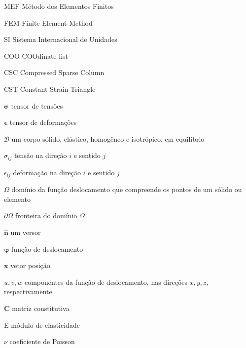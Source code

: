 
\listoffigures*
\cleardoublepage



\listoftables*
\cleardoublepage

\begin{siglas}
	\item[MEF] Método dos Elementos Finitos
	\item[FEM] Finite Element Method 
	\item[SI]  Sistema Internacional de Unidades
	\item[COO] COOdinate list
	\item[CSC] Compressed Sparse Column
	\item[CST] Constant Strain Triangle    
\end{siglas}



\begin{simbolos}

  \item[$\bm{\sigma}$] tensor de tensões
  \item[$\bm{\epsilon}$] tensor de deformações
  \item[$\mathcal{B}$] um corpo sólido, elástico, homogêneo e isotrópico, em equilíbrio
  \item[$\sigma_{ij}$] tensão na direção $i$ e sentido $j$
  \item[$\epsilon_{ij}$] deformação na direção $i$ e sentido $j$
  \item[$\Omega$] domínio da função deslocamento que compreende os pontos de um sólido ou elemento
  \item[$\partial\Omega$] fronteira do domínio $\Omega$
  \item[$\bm{\hat{n}}$] um versor
  \item[$\bm{\varphi}$] função de deslocamento
  \item[$\bm{x}$] vetor posição
  \item[$u,v,w$] componentes da função de deslocamento, nas direções $x,y,z$, respectivamente.
  \item[$\bm{C}$] matriz constitutiva
  \item[E] módulo de elasticidade
  \item[$\nu$] coeficiente de Poisson       
  
\end{simbolos}

